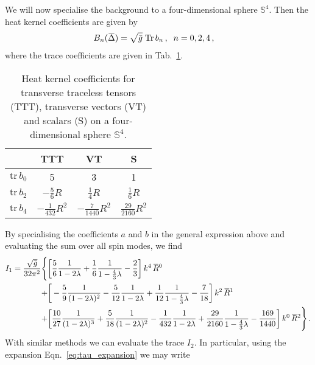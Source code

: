 \documentclass[11pt]{book}
\newcommand{\overbar}[1]{\mkern 1.5mu\overline{\mkern-1.5mu#1\mkern-1.5mu}\mkern 1.5mu}
\newcommand{\bR}{\overbar R}
\newcommand{\Tr}{\mathrm{Tr}}
\newcommand{\tr}{\mathrm{tr}}
\numberwithin{equation}{chapter}
\begin{document}
\begin{appendices}
We will now specialise the background to a four-dimensional sphere $\mathbb S^4$.
Then the heat kernel coefficients are given by
\begin{align}
  B_n(\overbar\Delta) &= \sqrt{ \bar g } \; \Tr \, b_n \,, \;\; n=0,2,4 \,,
\end{align}
where the trace coefficients are given in Tab.~\ref{tab:coeff}.
\begin{table}
	\begin{center}
		\begin{tabular}{  c  c  c  c  }
      \toprule[1mm]
      & TTT & VT & S \\[1mm]
			\midrule
      $\tr \, b_0$ & 5 & 3 & 1 \\[1mm]
      $\tr \, b_2$ & $-\frac 56 R$  & $\frac 14 R$  & $\frac 16 R$  \\[1mm]
      $\tr \, b_4$ & $-\frac {1}{432} R^2$  & $-\frac {7}{1440} R^2$  & $\frac {29}{2160} R^2$  \\[1mm]
			\bottomrule
		\end{tabular}
	\end{center}
  \caption{Heat kernel coefficients for transverse traceless tensors (TTT), transverse vectors (VT)
  and scalars (S) on a four-dimensional sphere $\mathbb S^4$.}
	\label{tab:coeff}
\end{table}
By specialising the coefficients $a$ and $b$ in the general expression above and evaluating the sum over
all spin modes, we find
\begin{align}
  I_1 =
  \frac{ \sqrt {\bar g} }{ 32 \pi^2 }
  \Bigg\lbrace
  &\bigg[
    \frac 56 \frac{1}{1 - 2 \lambda}
    + \frac 16 \frac{1}{1 - \frac 43 \lambda}
    - \frac 23
    \bigg] \, k^4 \, \bR^0
    \nonumber \\
    + &\bigg[
      - \frac {5}{9} \frac{1}{(1 - 2 \lambda)^2}
      - \frac {5}{12} \frac{1}{1 - 2 \lambda}
      + \frac {1}{12} \frac{1}{1 - \frac 43 \lambda}
      - \frac {7}{18}
    \bigg] \, k^2 \, \bR^1
    \nonumber \\
    + &\bigg[
      \frac {10}{27} \frac{1}{(1 - 2 \lambda)^3}
      + \frac {5}{18} \frac{1}{(1 - 2 \lambda)^2}
      - \frac {1}{432} \frac{1}{1 - 2 \lambda}
      + \frac {29}{2160} \frac{1}{1 - \frac 43 \lambda}
      - \frac {169}{1440}
    \bigg] \, k^0 \, \bR^2
  \Bigg\rbrace
    \,.
\end{align}
With similar methods we can evaluate the trace $I_2$. In particular,
using the expansion Eqn.~\eqref{eq:tau_expansion} we may write
\begin{align}

\end{align}
\end{appendices}
\end{document}
